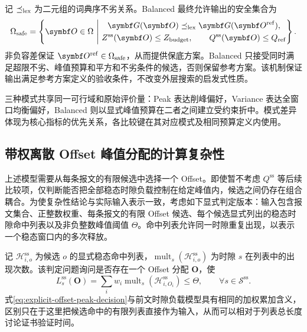 \documentclass[UTF8,a4paper,twoside,zihao=-4]{ctexart}
\numberwithin{equation}{section}
\numberwithin{figure}{section}
\numberwithin{table}{section}
\theoremstyle{definition}
\newcommand{\Sset}{\mathcal{S}}
\newcommand{\Hset}{\mathcal{H}}
\numberwithin{algocf}{section}
\begin{document}
记 $\preceq_{\rm lex}$ 为二元组的词典序不劣关系。Balanced 最终允许输出的安全集合为
\begin{equation}
 \Omega_{\rm safe}=
 \left\{
  \symbf O\in\Omega\ \middle|\
  \begin{gathered}
   \symbf G(\symbf O)
   \preceq_{\rm lex}
   \symbf G(\symbf O^{\rm ref}),\\
   Z^{\mathrm{ss}}(\symbf O)\le Z_{\rm budget},
   \qquad
   Q^{\mathrm{ss}}(\symbf O)\le Q_{\rm ref}
  \end{gathered}
 \right\}.
\label{eq:balanced-safe-set}
\end{equation}
非负容差保证 $\symbf O^{\rm ref}\in\Omega_{\rm safe}$，从而提供保底方案。Balanced 只接受同时满足超限不劣、峰值预算和平方和不劣条件的候选，否则保留参考方案。该机制保证输出满足参考方案定义的验收条件，不改变外层搜索的启发式性质。

三种模式共享同一可行域和原始评价量：Peak 表达削峰偏好，Variance 表达全窗口均衡偏好，Balanced 则以显式峰值预算在二者之间建立受约束折中。模式差异体现为核心指标的优先关系，各比较键在其对应模式及相同预算定义内使用。

\subsection{带权离散 Offset 峰值分配的计算复杂性}
\label{subsec:explicit-offset-peak-complexity}

上述模型需要从每条报文的有限候选中选择一个 Offset。即使暂不考虑 $Q^{\mathrm{ss}}$ 等后续比较项，仅判断能否把全部稳态时隙负载控制在给定峰值内，候选之间仍存在组合耦合。为使复杂性结论与实际输入表示一致，考虑如下显式判定版本：输入包含报文集合、正整数权重、每条报文的有限 Offset 候选、每个候选显式列出的稳态时隙命中列表以及非负整数峰值阈值 $\Theta$。命中列表允许同一时隙重复出现，以表示一个稳态窗口内的多次释放。

记 $\Hset_{i,o}^{\mathrm{ss}}$ 为候选 $o$ 的显式稳态命中列表，$\operatorname{mult}_s(\Hset_{i,o}^{\mathrm{ss}})$ 为时隙 $s$ 在列表中的出现次数。该判定问题询问是否存在一个 Offset 分配 $\symbf O$，使
\begin{equation}
 L_s^{\mathrm{ss}}(\symbf O)
 =\sum_i w_i
 \operatorname{mult}_s\!\left(\Hset_{i,O_i}^{\mathrm{ss}}\right)
 \le\Theta,
 \qquad \forall s\in\Sset^{\mathrm{ss}}.
\label{eq:explicit-offset-peak-decision}
\end{equation}
式\eqref{eq:explicit-offset-peak-decision}与前文时隙负载模型具有相同的加权累加含义，区别只在于这里把候选命中的有限列表直接作为输入，从而可以相对于列表总长度讨论证书验证时间。
\end{document}

